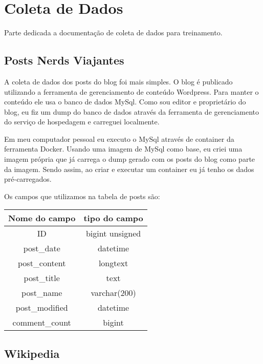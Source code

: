 \section{Coleta de Dados}

Parte dedicada a documentação de coleta de dados para treinamento.

\subsection{Posts Nerds Viajantes}

A coleta de dados dos posts do blog foi mais simples. O blog é publicado utilizando a ferramenta de gerenciamento de conteúdo Wordpress. Para manter 
o conteúdo ele usa o banco de dados MySql. Como sou editor e proprietário do blog, eu fiz um dump do banco de dados através da ferramenta de 
gerenciamento do serviço de hospedagem e carreguei localmente.

Em meu computador pessoal eu executo o MySql através de container da ferramenta Docker. Usando uma imagem de MySql como base, eu criei uma imagem própria 
que já carrega o dump gerado com os posts do blog como parte da imagem. Sendo assim, ao criar e executar um container eu já tenho os dados pré-carregados.

Os campos que utilizamos na tabela de posts são:

\begin{center}
    \begin{tabular}{ |c|c| }
        \hline
        Nome do campo & tipo do campo \\
        \hline
        \hline
        ID & bigint unsigned \\
        \hline
        post\_date & datetime \\
        \hline
        post\_content & longtext \\
        \hline
        post\_title & text \\
        \hline
        post\_name & varchar(200) \\
        \hline
        post\_modified & datetime \\
        \hline
        comment\_count & bigint \\
        \hline
    \end{tabular}
\end{center}

\subsection{Wikipedia}

